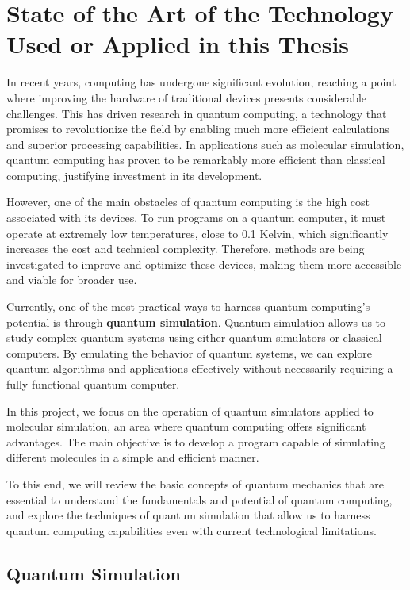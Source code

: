 \chapter[State of the Art]{State of the Art of the Technology Used or Applied in this Thesis}

In recent years, computing has undergone significant evolution, reaching a point where improving the hardware of traditional devices presents considerable challenges. This has driven research in quantum computing, a technology that promises to revolutionize the field by enabling much more efficient calculations and superior processing capabilities. In applications such as molecular simulation, quantum computing has proven to be remarkably more efficient than classical computing, justifying investment in its development.

However, one of the main obstacles of quantum computing is the high cost associated with its devices. To run programs on a quantum computer, it must operate at extremely low temperatures, close to 0.1 Kelvin, which significantly increases the cost and technical complexity. Therefore, methods are being investigated to improve and optimize these devices, making them more accessible and viable for broader use.

Currently, one of the most practical ways to harness quantum computing's potential is through \textbf{quantum simulation}. Quantum simulation allows us to study complex quantum systems using either quantum simulators or classical computers. By emulating the behavior of quantum systems, we can explore quantum algorithms and applications effectively without necessarily requiring a fully functional quantum computer.

In this project, we focus on the operation of quantum simulators applied to molecular simulation, an area where quantum computing offers significant advantages. The main objective is to develop a program capable of simulating different molecules in a simple and efficient manner.

To this end, we will review the basic concepts of quantum mechanics that are essential to understand the fundamentals and potential of quantum computing, and explore the techniques of quantum simulation that allow us to harness quantum computing capabilities even with current technological limitations.

\section{Quantum Simulation}

